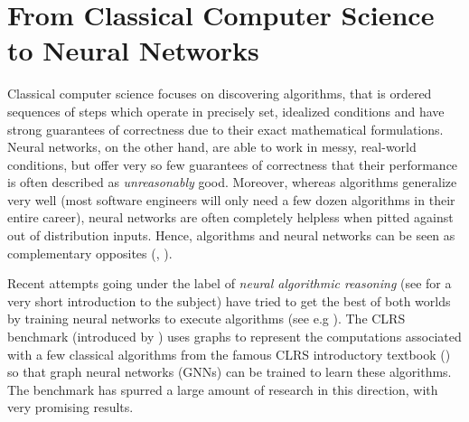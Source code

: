 \documentclass[11pt,a4paper,openright,twoside]{report}
\theoremstyle{plain}
\theoremstyle{definition}
\begin{document}
\clearpage{\pagestyle{empty}\cleardoublepage}




























































\chapter{From Classical Computer Science to Neural Networks}


\lhead[\fancyplain{}{\bfseries\thepage}]{\fancyplain{}{\bfseries\rightmark}}




Classical computer science focuses on discovering algorithms, that is ordered sequences of steps which operate in precisely set, idealized conditions and have strong guarantees of correctness due to their exact mathematical formulations. Neural networks, on the other hand, are able to work in messy, real-world conditions, but offer very so few guarantees of correctness that their performance is often described as \textit{unreasonably} good. Moreover, whereas algorithms generalize very well (most software engineers will only need a few dozen algorithms in their entire career), neural networks are often completely helpless when pitted against out of distribution inputs. Hence, algorithms and neural networks can be seen as complementary opposites (\cite{velivckovic2021neural}, \cite{velivckovic2022clrs}).


Recent attempts going under the label of \textit{neural algorithmic reasoning} (see \cite{velivckovic2021neural} for a very short introduction to the subject) have tried to get the best of both worlds by training neural networks to execute algorithms (see e.g \cite{ibarz2022generalist}). The CLRS benchmark (introduced by \cite{velivckovic2022clrs}) uses graphs to represent the computations associated with a few classical algorithms from the famous CLRS introductory textbook (\cite{cormen2022introduction}) so that graph neural networks (GNNs) can be trained to learn these algorithms. The benchmark has spurred a large amount of research in this direction, with very promising results.
\end{document}
